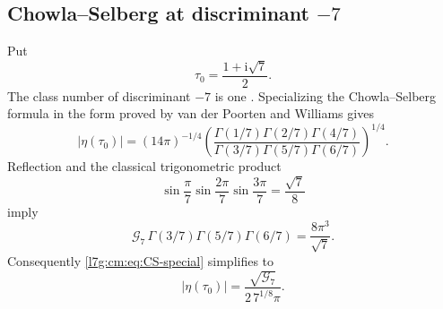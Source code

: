 \documentclass[11pt,letterpaper]{article}
\theoremstyle{remark}\newtheorem{remark}[theorem]{Remark}
\newcommand{\G}{\mathcal G_7}\newcommand{\Ast}{A_\star}
\newcommand{\ii}{\mathrm i}\newcommand{\ee}{\mathrm e}
\newcounter{l7gtrsavedeq}
\begin{document}
\subsection{Chowla--Selberg at discriminant \texorpdfstring{$-7$}{-7}}
Put
\begin{equation}\label{l7g:cm:eq:tau0}
 \tau_0=\frac{1+\ii\sqrt7}{2}.
\end{equation}
The class number of discriminant $-7$ is one \cite{l7g:cox}. Specializing
the Chowla--Selberg formula in the form proved by van der Poorten and
Williams \cite{l7g:vdpw} gives
\begin{equation}\label{l7g:cm:eq:CS-special}
 |\eta(\tau_0)|
 =(14\pi)^{-1/4}
 \left(
 \frac{\Gamma(1/7)\Gamma(2/7)\Gamma(4/7)}
 {\Gamma(3/7)\Gamma(5/7)\Gamma(6/7)}
 \right)^{1/4}.
\end{equation}
Reflection \cite[Ch.~5]{l7g:dlmf} and the classical trigonometric product
\begin{equation}\label{l7g:cm:eq:sin-product}
 \sin\frac\pi7\sin\frac{2\pi}7\sin\frac{3\pi}7
 =\frac{\sqrt7}{8}
\end{equation}
imply
\[
 \G\,\Gamma(3/7)\Gamma(5/7)\Gamma(6/7)
 =\frac{8\pi^3}{\sqrt7}.
\]
Consequently \eqref{l7g:cm:eq:CS-special} simplifies to
\begin{equation}\label{l7g:cm:eq:eta-tau0}
 |\eta(\tau_0)|=\frac{\sqrt{\G}}{2\,7^{1/8}\pi}.
\end{equation}
\end{document}
